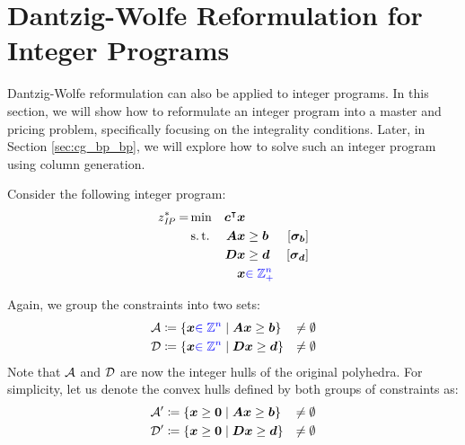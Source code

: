 \section{Dantzig-Wolfe Reformulation for Integer Programs}\label{sec:cg_bp_ip}
Dantzig-Wolfe reformulation can also be applied to integer programs. In this section, we will show how to reformulate an integer program into a master and pricing problem, specifically focusing on the integrality conditions. Later, in Section \ref{sec:cg_bp_bp}, we will explore how to solve such an integer program using column generation.

Consider the following integer program:
\begin{equation}
\begin{aligned}
z^*_{\textit{IP}}{} = &\min & {\bm{c}}^\intercal {\bm{x}} & & & \\
&\operatorname{s.t.} & {\bm{A}} {\bm{x}} & \geq {\bm{b}} & \left[{\bm{\sigma}}_{\bm{b}}\right] & \\
&& {\bm{D}} {\bm{x}} & \geq {\bm{d}} & \left[{\bm{\sigma}}_{\bm{d}}\right] & \\
&& {\bm{x}} & {\color{blue} \in \mathbb{Z}_ +^n}
\end{aligned}
\end{equation}

Again, we group the constraints into two sets:
\begin{equation}
\begin{aligned}
\mathcal{A} &\coloneqq \left\{ {\bm{x}} {\color{blue} \in \mathbb{Z}^n} \mid {\bm{A}} {\bm{x}} \geq {\bm{b}} \right\} &\neq \emptyset \\
\mathcal{D} &\coloneqq \left\{ {\bm{x}} {\color{blue} \in \mathbb{Z}^n} \mid {\bm{D}} {\bm{x}} \geq {\bm{d}} \right\} &\neq \emptyset
\end{aligned}
\end{equation}
Note that $\mathcal{A}$ and $\mathcal{D}$ are now the integer hulls of the original polyhedra. For simplicity, let us denote the convex hulls defined by both groups of constraints as:
\begin{equation}
\begin{aligned}
\mathcal{A}' &\coloneqq \left\{ {\bm{x}} \geq {\bm{0}} \mid {\bm{A}} {\bm{x}} \geq {\bm{b}} \right\} &\neq \emptyset \\
\mathcal{D}' &\coloneqq \left\{ {\bm{x}} \geq {\bm{0}} \mid {\bm{D}} {\bm{x}} \geq {\bm{d}} \right\} &\neq \emptyset
\end{aligned}
\end{equation}

